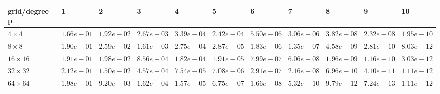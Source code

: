 \begin{tabular}{lllllllllll}
\hline
 grid/degree p   & 1          & 2          & 3          & 4          & 5          & 6          & 7          & 8          & 9          & 10         \\
\hline
 $4 \times 4$    & $1.66e-01$ & $1.92e-02$ & $2.67e-03$ & $3.39e-04$ & $2.42e-04$ & $5.50e-06$ & $3.06e-06$ & $3.82e-08$ & $2.32e-08$ & $1.95e-10$ \\
 $8 \times 8$    & $1.90e-01$ & $2.59e-02$ & $1.61e-03$ & $2.75e-04$ & $2.87e-05$ & $1.83e-06$ & $1.35e-07$ & $4.58e-09$ & $2.81e-10$ & $8.03e-12$ \\
 $16 \times 16$  & $1.91e-01$ & $1.98e-02$ & $8.56e-04$ & $1.82e-04$ & $1.91e-05$ & $7.99e-07$ & $6.06e-08$ & $1.96e-09$ & $1.16e-10$ & $3.03e-12$ \\
 $32 \times 32$  & $2.12e-01$ & $1.50e-02$ & $4.57e-04$ & $7.54e-05$ & $7.08e-06$ & $2.91e-07$ & $2.16e-08$ & $6.96e-10$ & $4.10e-11$ & $1.11e-12$ \\
 $64 \times 64$  & $1.98e-01$ & $9.20e-03$ & $1.62e-04$ & $1.57e-05$ & $6.75e-07$ & $1.66e-08$ & $5.32e-10$ & $9.79e-12$ & $7.24e-13$ & $1.11e-12$ \\
\hline
\end{tabular}